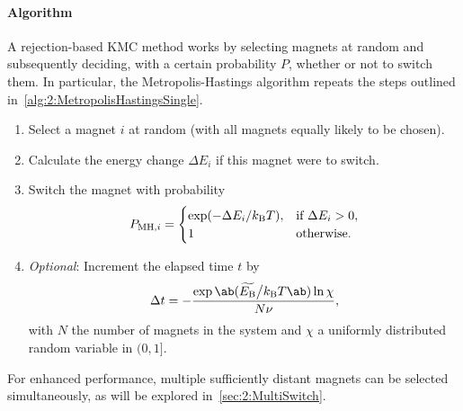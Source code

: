 \paragraph{Algorithm}
A rejection-based KMC method works by selecting magnets at random and subsequently deciding, with a certain probability $P$, whether or not to switch them.
In particular, the Metropolis-Hastings algorithm repeats the steps outlined in~\cref{alg:2:MetropolisHastingsSingle}.
\begin{algorithm}
	\label{alg:2:MetropolisHastingsSingle}
	\begin{enumerate}
		\item Select a magnet $i$ at random (with all magnets equally likely to be chosen).
		\item Calculate the energy change $\Delta E_i$ if this magnet were to switch.
		\item Switch the magnet with probability
		\begin{equation}
			\label{eq:2:MH_acceptance}
			P_{\mathrm{MH},i} = \begin{cases}
				\exp(-\Delta E_i/\kBT), & \text{if } \Delta E_i > 0 \mathrm{,} \\
				1 & \text{otherwise} \mathrm{.}
			\end{cases}
		\end{equation} %
		\item \textit{Optional}:
		Increment the elapsed time $t$ by
		\begin{equation}
			\Delta t = -\frac{\exp\ab(\EBeff\big/\kBT\ab) \ln{\chi}}{N \nu} \mathrm{,}
			\label{eq:Metropolis_time}
		\end{equation}
		with $N$ the number of magnets in the system and $\chi$ a uniformly distributed random variable in $(0,1]$.~\cite{PhysicalTimeKMC}
	\end{enumerate}
\end{algorithm}
For enhanced performance, multiple sufficiently distant magnets can be selected simultaneously, as will be explored in~\cref{sec:2:MultiSwitch}.

